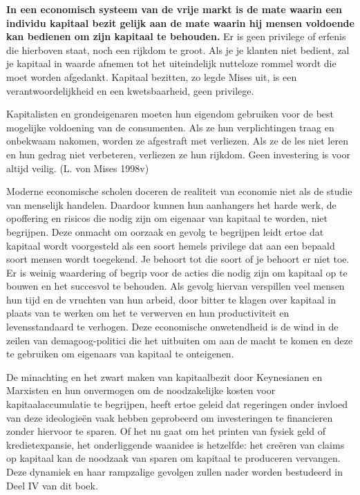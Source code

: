 \documentclass[
  a5paper,
  smalldemyvopaper,11pt,twoside,onecolumn,openright,extrafontsizes,
hidelinks]{memoir}
\begin{document}
\textbf{In een economisch systeem van de vrije markt is de mate waarin
een individu kapitaal bezit gelijk aan de mate waarin hij mensen
voldoende kan bedienen om zijn kapitaal te behouden.} Er is geen
privilege of erfenis die hierboven staat, noch een rijkdom te groot. Als
je je klanten niet bedient, zal je kapitaal in waarde afnemen tot het
uiteindelijk nutteloze rommel wordt die moet worden afgedankt. Kapitaal
bezitten, zo legde Mises uit, is een verantwoordelijkheid en een
kwetsbaarheid, geen privilege.

Kapitalisten en grondeigenaren moeten hun eigendom gebruiken voor de
best mogelijke voldoening van de consumenten. Als ze hun verplichtingen
traag en onbekwaam nakomen, worden ze afgestraft met verliezen. Als ze
de les niet leren en hun gedrag niet verbeteren, verliezen ze hun
rijkdom. Geen investering is voor altijd veilig. (L. von Mises 1998v)

Moderne economische scholen doceren de realiteit van economie niet als
de studie van menselijk handelen. Daardoor kunnen hun aanhangers het
harde werk, de opoffering en risicos die nodig zijn om eigenaar van
kapitaal te worden, niet begrijpen. Deze onmacht om oorzaak en gevolg te
begrijpen leidt ertoe dat kapitaal wordt voorgesteld als een soort
hemels privilege dat aan een bepaald soort mensen wordt toegekend. Je
behoort tot die soort of je behoort er niet toe. Er is weinig waardering
of begrip voor de acties die nodig zijn om kapitaal op te bouwen en het
succesvol te behouden. Als gevolg hiervan verspillen veel mensen hun
tijd en de vruchten van hun arbeid, door bitter te klagen over kapitaal
in plaats van te werken om het te verwerven en hun productiviteit en
levensstandaard te verhogen. Deze economische onwetendheid is de wind in
de zeilen van demagoog-politici die het uitbuiten om aan de macht te
komen en deze te gebruiken om eigenaars van kapitaal te onteigenen.

De minachting en het zwart maken van kapitaalbezit door Keynesianen en
Marxisten en hun onvermogen om de noodzakelijke kosten voor
kapitaalaccumulatie te begrijpen, heeft ertoe geleid dat regeringen
onder invloed van deze ideologieën vaak hebben geprobeerd om
investeringen te financieren zonder hiervoor te sparen. Of het nu gaat
om het printen van fysiek geld of kredietexpansie, het onderliggende
waanidee is hetzelfde: het creëren van claims op kapitaal kan de
noodzaak van sparen om kapitaal te produceren vervangen. Deze dynamiek
en haar rampzalige gevolgen zullen nader worden bestudeerd in Deel IV
van dit boek.
\end{document}
